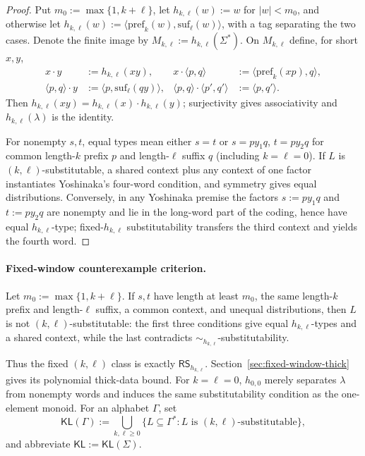 \documentclass[11pt,a4paper]{article}
\theoremstyle{remark}
\theoremstyle{plain}
\newcommand{\pref}{\mathrm{pref}}
\newcommand{\suf}{\mathrm{suf}}
\begin{document}
\begin{proof}
Put $m_0:=\max\{1,k+\ell\}$, let $h_{k,\ell}(w):=w$ for
$|w|<m_0$, and otherwise let
$h_{k,\ell}(w):=\langle\pref_k(w),\suf_\ell(w)\rangle$, with a tag
separating the two cases.  Denote the finite image by
$M_{k,\ell}:=h_{k,\ell}(\Sigma^*)$.  On $M_{k,\ell}$ define, for short
$x,y$,
\[
\begin{aligned}
x\cdot y&:=h_{k,\ell}(xy),&
x\cdot\langle p,q\rangle&:=\langle\pref_k(xp),q\rangle,\\
\langle p,q\rangle\cdot y&:=\langle p,\suf_\ell(qy)\rangle,&
\langle p,q\rangle\cdot\langle p',q'\rangle&:=\langle p,q'\rangle.
\end{aligned}
\]
Then $h_{k,\ell}(xy)=h_{k,\ell}(x)\cdot h_{k,\ell}(y)$; surjectivity
gives associativity and $h_{k,\ell}(\lambda)$ is the identity.

For nonempty $s,t$, equal types mean either $s=t$ or
$s=py_1q$, $t=py_2q$ for common length-$k$ prefix $p$ and length-$\ell$
suffix $q$ (including $k=\ell=0$).  If $L$ is
$(k,\ell)$-substitutable, a shared context plus any context of one factor
instantiates Yoshinaka's four-word condition, and symmetry gives equal
distributions.  Conversely, in any Yoshinaka premise the factors
$s:=py_1q$ and $t:=py_2q$ are nonempty and lie in the long-word part of the
coding, hence have equal $h_{k,\ell}$-type; fixed-$h_{k,\ell}$
substitutability transfers the third context and yields the fourth word.
\end{proof}

\label{crit:kl}
\paragraph{Fixed-window counterexample criterion.}
Let $m_0:=\max\{1,k+\ell\}$.  If $s,t$ have length at least $m_0$, the
same length-$k$ prefix and length-$\ell$ suffix, a common context, and
unequal distributions, then $L$ is not $(k,\ell)$-substitutable: the first
three conditions give equal $h_{k,\ell}$-types and a shared context, while
the last contradicts $\sim_{h_{k,\ell}}$-substitutability.

Thus the fixed $(k,\ell)$ class is exactly
$\mathsf{RS}_{h_{k,\ell}}$.  Section~\ref{sec:fixed-window-thick} gives
its polynomial thick-data bound.  For $k=\ell=0$,
$h_{0,0}$ merely separates $\lambda$ from nonempty words and induces the
same substitutability condition as the one-element monoid.  For an alphabet
$\Gamma$, set
\[
\mathsf{KL}(\Gamma):=
\bigcup_{k,\ell\ge0}
\{L\subseteq\Gamma^*:L\text{ is $(k,\ell)$-substitutable}\},
\]
and abbreviate $\mathsf{KL}:=\mathsf{KL}(\Sigma)$.
\end{document}
